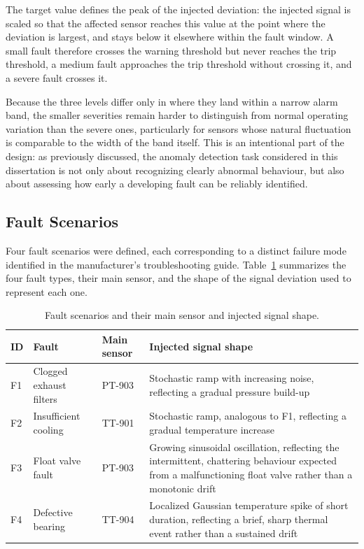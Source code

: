 The target value defines the peak of the injected deviation: the injected signal is scaled so that the
affected sensor reaches this value at the point where the deviation is largest, and stays below it
elsewhere within the fault window. A small fault therefore crosses the warning threshold but never
reaches the trip threshold, a medium fault approaches the trip threshold without crossing it, and a
severe fault crosses it.

Because the three levels differ only in where they land within a narrow alarm band, the smaller
severities remain harder to distinguish from normal operating variation than the severe ones,
particularly for sensors whose natural fluctuation is comparable to the width of the band itself. This is
an intentional part of the design: as previously discussed, the anomaly detection task considered in this
dissertation is not only about recognizing clearly abnormal behaviour, but also about assessing how
early a developing fault can be reliably identified.

\subsection{Fault Scenarios} \label{sec:fault_single}

Four fault scenarios were defined, each corresponding to a distinct failure mode identified in the 
manufacturer's troubleshooting guide. Table~\ref{tab:fault_types} summarizes the four fault types, their 
main sensor, and the shape of the signal deviation used to represent each one.

\begin{table}[htbp]
\centering
\caption{Fault scenarios and their main sensor and injected signal shape.}
\label{tab:fault_types}
\small
\begin{tabular}{p{1cm}p{3.3cm}p{2cm}p{6cm}}
\hline
\textbf{ID} & \textbf{Fault} & \textbf{Main sensor} & \textbf{Injected signal shape} \\
\hline
F1 & Clogged exhaust filters & PT-903 & Stochastic ramp with increasing 
noise, reflecting a gradual pressure build-up \\
F2 & Insufficient cooling & TT-901 & Stochastic ramp, analogous to F1, reflecting a gradual 
temperature increase \\
F3 & Float valve fault & PT-903 & Growing sinusoidal oscillation, reflecting the intermittent, 
chattering behaviour expected from a malfunctioning float valve rather than a monotonic drift \\
F4 & Defective bearing & TT-904 & Localized Gaussian temperature spike of short duration, reflecting a 
brief, sharp thermal event rather than a sustained drift \\
\hline
\end{tabular}
\end{table}

